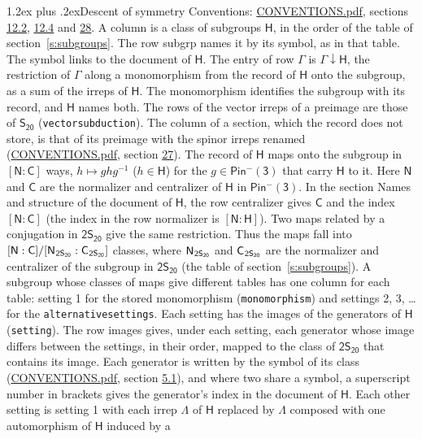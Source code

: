\documentclass[10pt,a4paper]{article}
\makeatletter
\renewcommand\section{\@startsection{section}{1}{\z@}{-3ex plus -1ex minus -.2ex}%
  {1.2ex plus .2ex}{\normalfont\large\sffamily\bfseries\color{parttitle}}}
\numberwithin{equation}{section}
\newcommand{\grp}[1]{\mathsf{#1}}
\newcommand{\grpindex}[2]{[#1 : #2]}
\newcommand{\restr}[2]{#1\!\downarrow#2}
\newcommand{\hairsp}{\mkern1mu}
\makeatother
\begin{document}
\section{Descent of symmetry}\label{s:subduction}
Conventions: \href{../../CONVENTIONS.pdf}{CONVENTIONS.pdf}, sections \href{../../../rotation/CONVENTIONS.pdf\#conv.12.2}{12.2}, \href{../../../rotation/CONVENTIONS.pdf\#conv.12.4}{12.4} and \href{../../CONVENTIONS.pdf\#conv.28}{28}.
A column is a class of subgroups $\grp{H}$, in the order of the table of section~\ref{s:subgroups}. The row subgrp names it by its symbol, as in that table. The symbol links to the document of $\grp{H}$. The entry of row $\Gamma$ is $\restr{\Gamma}{\grp{H}}$, the restriction of $\Gamma$ along a monomorphism from the record of $\grp{H}$ onto the subgroup, as a sum of the irreps of $\grp{H}$. The monomorphism identifies the subgroup with its record, and $\grp{H}$ names both. The rows of the vector irreps of a preimage are those of \href{../../../rotation/data/pdf/S20.pdf}{$\grp{S_{20}}$} (\texttt{vectorsubduction}). The column of a section, which the record does not store, is that of its preimage with the spinor irreps renamed (\href{../../CONVENTIONS.pdf}{CONVENTIONS.pdf}, section \href{../../CONVENTIONS.pdf\#conv.27}{27}). \label{n:group.normalizer.o3}\label{n:group.centralizer.o3}\label{n:element.h}The record of $\grp{H}$ maps onto the subgroup in $\grpindex{\grp{N}}{\grp{C}}$ ways, $h \mapsto g h g^{-1}$ ($h \in \grp{H}$) for the $g \in \grp{Pin^{-}(3)}$ that carry $\grp{H}$ to it. Here $\grp{N}$ and $\grp{C}$ are the normalizer and centralizer of $\grp{H}$ in \href{Pinminus3.pdf}{$\grp{Pin^{-}(3)}$}. In the section Names and structure of the document of $\grp{H}$, the row centralizer gives $\grp{C}$ and the index $\grpindex{\grp{N}}{\grp{C}}$ (the index in the row normalizer is $\grpindex{\grp{N}}{\grp{H}}$). Two maps related by a conjugation in $\grp{2S_{20}}$ give the same restriction. Thus the maps fall into $\grpindex{\grp{N}}{\grp{C}}/\grpindex{\grp{N}_{\hairsp \grp{2S_{20}}}}{\grp{C}_{\hairsp \grp{2S_{20}}}}$ classes, where $\grp{N}_{\hairsp \grp{2S_{20}}}$ and $\grp{C}_{\hairsp \grp{2S_{20}}}$ are the normalizer and centralizer of the subgroup in $\grp{2S_{20}}$ (the table of section~\ref{s:subgroups}). \label{n:head.setting}A subgroup whose classes of maps give different tables has one column for each table: setting 1 for the stored monomorphism (\texttt{monomorphism}) and settings 2, 3, \dots{} for the \texttt{alternativesettings}. Each setting has the images of the generators of $\grp{H}$ (\texttt{setting}). \label{n:head.images}The row images gives, under each setting, each generator whose image differs between the settings, in their order, mapped to the class of $\grp{2S_{20}}$ that contains its image. Each generator is written by the symbol of its class (\href{../../CONVENTIONS.pdf}{CONVENTIONS.pdf}, section \href{../../../rotation/CONVENTIONS.pdf\#conv.5.1}{5.1}), and where two share a symbol, a superscript number in brackets gives the generator's index in the document of $\grp{H}$. \label{n:irrep.Delta}Each other setting is setting 1 with each irrep $\Lambda$ of $\grp{H}$ replaced by $\Lambda$ composed with one automorphism of $\grp{H}$ induced by a 
\end{document}
